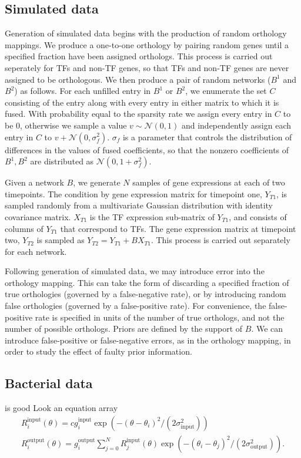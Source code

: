 \documentclass[11pt]{article}
\begin{document}
\subsection{Simulated data}
Generation of simulated data begins with the production of random orthology mappings. We produce a one-to-one orthology by pairing random genes until a specified fraction have been assigned orthologs. This process is carried out seperately for TFs and non-TF genes, so that TFs and non-TF genes are never assigned to be orthologous. We then produce a pair of random networks ($B^1$ and $B^2$) as follows. For each unfilled entry in $B^1$ or $B^2$, we enumerate the set $C$ consisting of the entry along with every entry in either matrix to which it is fused. With probability equal to the sparsity rate we assign every entry in $C$ to be 0, otherwise we sample a value $v \sim \mathcal{N}(0,1)$ and independently assign each entry in $C$ to $v + \mathcal{N}(0, \sigma_f^2)$. $\sigma_f$ is a parameter that controls the distribution of differences in the values of fused coefficients, so that the nonzero coefficients of $B^1, B^2$ are distributed as $\mathcal{N}(0, 1 + \sigma_f^2)$.

Given a network $B$, we generate $N$ samples of gene expressions at each of two timepoints. The condition by gene expression matrix for timepoint one, $Y_{T1}$, is sampled randomly from a multivariate Gaussian distribution with identity covariance matrix. $X_{T1}$ is the TF expression sub-matrix of $Y_{T1}$, and consists of columns of $Y_{T1}$ that correspond to TFs. The gene expression matrix at timepoint two, $Y_{T2}$ is sampled as $Y_{T2} = Y_{T1} + BX_{T1}$. This process is carried out separately for each network. 

Following generation of simulated data, we may introduce error into the orthology mapping. This can take the form of discarding a specified fraction of true orthologies (governed by a false-negative rate), or by introducing random false orthologies (governed by a false-positive rate). For convenience, the false-positive rate is specified in units of the number of true orthologs, and not the number of possible orthologs. Priors are defined by the support of $B$. We can introduce false-positive or false-negative errors, as in the orthology mapping, in order to study the effect of faulty prior information. 
\subsection{Bacterial data}
is good
Look an equation array
\begin{equation}
\begin{array}{l}
R_i^{\mathrm{input}}(\theta) = c g_i^{\mathrm{input}}\exp(-(\theta - \theta_i)^2 / (2\sigma^2_{\mathrm{input}}))
\\
R_i^{\mathrm{output}}(\theta) = g_i^{\mathrm{output}}\sum_{j=0}^N R_j^{\mathrm{input}}(\theta) \exp(-(\theta_i - \theta_j)^2/(2\sigma^2_{\mathrm{output}})) .
\end{array}
\end{equation}


\end{document}
